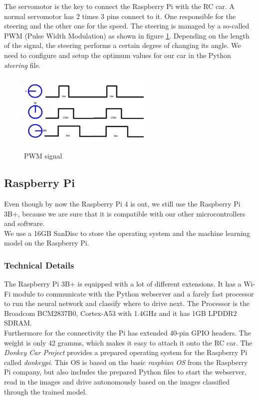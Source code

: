 \documentclass[journal]{IEEEtran}
\begin{document}
The servomotor is the key to connect the Raspberry Pi with the RC car. A normal servomotor has 2 times 3 pins connect to it. One responsible for the steering and the other one for the speed. The steering is managed by a so-called PWM (Pulse Width Modulation) as shown in figure \ref{pwm}. Depending on the length of the signal, the steering performs a certain degree of changing its angle. We need to configure and setup the optimum values for our car in the Python \textit{steering} file. \\

\begin{figure}
  \begin{center}
  \includegraphics[width=2.5in]{photo/pwm}\\
  \caption{PWM signal}\label{pwm}
  \end{center}
\end{figure}

\subsection{Raspberry Pi}
Even though by now the Raspberry Pi 4 is out, we still use the Raspberry Pi 3B+, because we are sure that it is compatible with our other microcontrollers and software. \\
We use a 16GB SanDisc to store the operating system and the machine learning model on the Raspberry Pi. \\

\subsubsection{Technical Details}
The Raspberry Pi 3B+ is equipped with a lot of different extensions. It has a Wi-Fi module to communicate with the Python webserver and a farely fast processor to run the neural network and classify where to drive next. The Processor is the Broadcom BCM2837B0, Cortex-A53 with 1.4GHz and it has 1GB LPDDR2 SDRAM. \\
Furthermore for the connectivity the Pi has extended 40-pin GPIO headers. The weight is only 42 gramms, which makes it easy to attach it onto the RC car. The \textit{Donkey Car Project} \cite{donkey} provides a prepared operating system for the Raspberry Pi called \textit{donkeypi}. This OS is based on the basic \textit{raspbian OS} from the Raspberry Pi company, but also includes the prepared Python files to start the webserver, read in the images and drive autonomously based on the images classified through the trained model. \\
\end{document}
